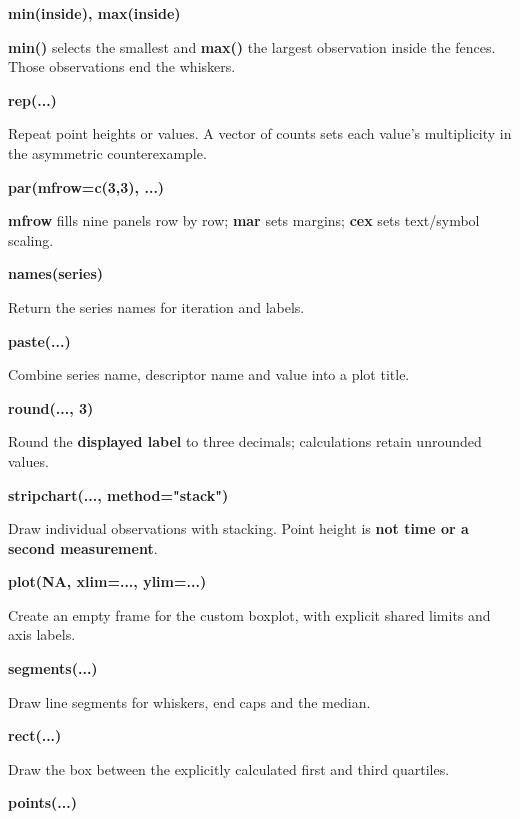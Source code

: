 \documentclass[11pt,a4paper]{article}
\begin{document}
\par\noindent\textbf{min(inside), max(inside)}

\textbf{min()} selects the smallest and \textbf{max()} the largest observation inside the fences. Those observations end the whiskers.

\par\noindent\textbf{rep(...)}

Repeat point heights or values. A vector of counts sets each value's multiplicity in the asymmetric counterexample.

\par\noindent\textbf{par(mfrow=c(3,3), ...)}

\textbf{mfrow} fills nine panels row by row; \textbf{mar} sets margins; \textbf{cex} sets text/symbol scaling.

\par\noindent\textbf{names(series)}

Return the series names for iteration and labels.

\par\noindent\textbf{paste(...)}

Combine series name, descriptor name and value into a plot title.

\par\noindent\textbf{round(..., 3)}

Round the \textbf{displayed label} to three decimals; calculations retain unrounded values.

\par\noindent\textbf{stripchart(..., method="stack")}

Draw individual observations with stacking. Point height is \textbf{not time or a second measurement}.

\par\noindent\textbf{plot(NA, xlim=..., ylim=...)}

Create an empty frame for the custom boxplot, with explicit shared limits and axis labels.

\par\noindent\textbf{segments(...)}

Draw line segments for whiskers, end caps and the median.

\par\noindent\textbf{rect(...)}

Draw the box between the explicitly calculated first and third quartiles.

\par\noindent\textbf{points(...)}
\end{document}

